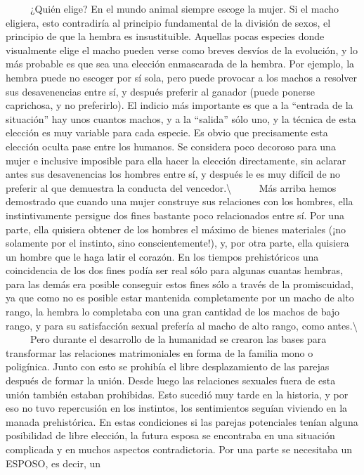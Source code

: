 ~ ~ ~ ¿Quién elige? En el mundo animal siempre escoge la mujer. Si el
macho eligiera, esto contradiría al principio fundamental de la división
de sexos, el principio de que la hembra es insustituible. Aquellas pocas
especies donde visualmente elige el macho pueden verse como breves
desvíos de la evolución, y lo más probable es que sea una elección
enmascarada de la hembra. Por ejemplo, la hembra puede no escoger por sí
sola, pero puede provocar a los machos a resolver sus desavenencias
entre sí, y después preferir al ganador (puede ponerse caprichosa, y no
preferirlo). El indicio más importante es que a la ``entrada de la
situación'' hay unos cuantos machos, y a la ``salida'' sólo uno, y la
técnica de esta elección es muy variable para cada especie. Es obvio que
precisamente esta elección oculta pase entre los humanos. Se considera
poco decoroso para una mujer e inclusive imposible para ella hacer la
elección directamente, sin aclarar antes sus desavenencias los hombres
entre sí, y después le es muy difícil de no preferir al que demuestra la
conducta del vencedor.\textbackslash{} ~ ~ ~ Más arriba hemos demostrado
que cuando una mujer construye sus relaciones con los hombres, ella
instintivamente persigue dos fines bastante poco relacionados entre sí.
Por una parte, ella quisiera obtener de los hombres el máximo de bienes
materiales (¡no solamente por el instinto, sino conscientemente!), y,
por otra parte, ella quisiera un hombre que le haga latir el corazón. En
los tiempos prehistóricos una coincidencia de los dos fines podía ser
real sólo para algunas cuantas hembras, para las demás era posible
conseguir estos fines sólo a través de la promiscuidad, ya que como no
es posible estar mantenida completamente por un macho de alto rango, la
hembra lo completaba con una gran cantidad de los machos de bajo rango,
y para su satisfacción sexual prefería al macho de alto rango, como
antes.\textbackslash{} ~ ~ ~ Pero durante el desarrollo de la humanidad
se crearon las bases para transformar las relaciones matrimoniales en
forma de la familia mono o poligínica. Junto con esto se prohibía el
libre desplazamiento de las parejas después de formar la unión. Desde
luego las relaciones sexuales fuera de esta unión también estaban
prohibidas. Esto sucedió muy tarde en la historia, y por eso no tuvo
repercusión en los instintos, los sentimientos seguían viviendo en la
manada prehistórica. En estas condiciones si las parejas potenciales
tenían alguna posibilidad de libre elección, la futura esposa se
encontraba en una situación complicada y en muchos aspectos
contradictoria. Por una parte se necesitaba un ESPOSO, es decir, un
